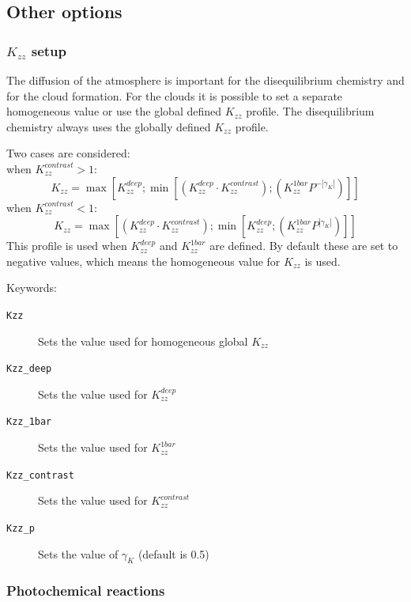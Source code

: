 \documentclass[12pt]{article}
\begin{document}
\subsection{Other options}

\subsubsection{$K_{zz}$ setup}
The diffusion of the atmosphere is important for the disequilibrium chemistry and for the cloud formation. For the clouds it is possible to set a separate homogeneous value or use the global defined $K_{zz}$ profile. The disequilibrium chemistry always uses the globally defined $K_{zz}$ profile.

Two cases are considered:\\
when $K_{zz}^{contrast} > 1$:
\begin{equation}
K_{zz}=\max\left[ K_{zz}^{deep} ; \min\left[ \left(K_{zz}^{deep}\cdot K_{zz}^{contrast} \right) ; \left(K_{zz}^{1bar} P^{-|\gamma_{K}|} \right) \right] \right]
\end{equation}
when $K_{zz}^{contrast} < 1$:
\begin{equation}
K_{zz}=\max\left[ \left(K_{zz}^{deep}\cdot K_{zz}^{contrast} \right) ; \min\left[ K_{zz}^{deep} ; \left(K_{zz}^{1bar} P^{|\gamma_{K}|} \right) \right] \right]
\end{equation}
This profile is used when $K_{zz}^{deep}$ and $K_{zz}^{1bar}$ are defined. By default these are set to negative values, which means the homogeneous value for $K_{zz}$ is used.

Keywords:
\begin{description}
\item[\texttt{Kzz}]
Sets the value used for homogeneous global $K_{zz}$
\item[\texttt{Kzz\_deep}]
Sets the value used for $K_{zz}^{deep}$
\item[\texttt{Kzz\_1bar}]
Sets the value used for $K_{zz}^{1bar}$
\item[\texttt{Kzz\_contrast}]
Sets the value used for $K_{zz}^{contrast}$
\item[\texttt{Kzz\_p}]
Sets the value of $\gamma_K$ (default is 0.5)
\end{description}

\subsubsection{Photochemical reactions}
\end{document}
